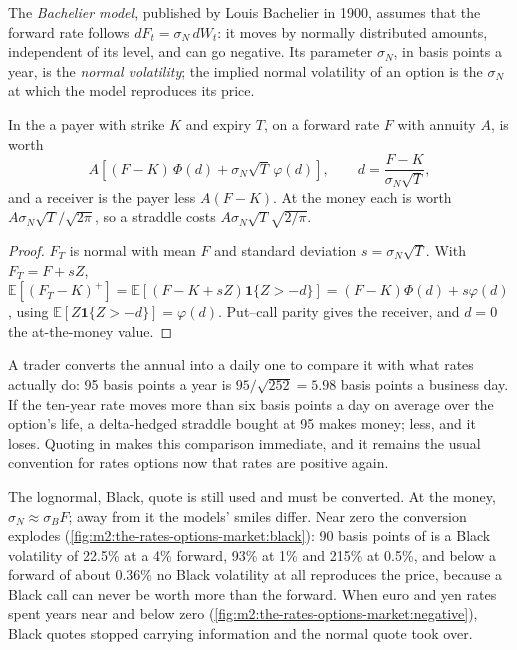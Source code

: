\begin{definition}\label{def:m2:the-rates-options-market:normal}
The \emph{Bachelier model}, published by Louis Bachelier
in 1900, assumes that the forward rate follows $dF_t = \sigma_N\,dW_t$: it
moves by normally distributed amounts, independent of its level, and can go
negative. Its parameter $\sigma_N$, in basis points a year, is the \emph{normal
volatility}; the implied normal volatility of an option
is the $\sigma_N$ at which the model reproduces its price.
\end{definition}

\begin{proposition}\label{prop:m2:the-rates-options-market:bachelier}
In the  a payer with strike $K$ and expiry $T$, on a forward
rate $F$ with annuity $A$, is worth
\[
A\left[(F-K)\,\Phi(d) + \sigma_N\sqrt{T}\,\varphi(d)\right], \qquad d = \frac{F-K}{\sigma_N\sqrt T},
\]
and a receiver is the payer less $A(F-K)$. At the money each is worth
$A\sigma_N\sqrt{T}/\sqrt{2\pi}$, so a straddle costs
$A\sigma_N\sqrt{T}\sqrt{2/\pi}$.
\end{proposition}

\begin{proof}
$F_T$ is normal with mean $F$ and standard deviation $s = \sigma_N\sqrt{T}$.
With $F_T = F + sZ$, $\mathbb{E}[(F_T-K)^+] = \mathbb{E}[(F-K+sZ)\mathbf 1\{Z>-d\}]
= (F-K)\Phi(d) + s\varphi(d)$, using $\mathbb{E}[Z\mathbf 1\{Z>-d\}] = \varphi(d)$.
Put--call parity gives the receiver, and $d = 0$ the at-the-money value.
\end{proof}

A trader converts the annual  into a daily one to compare it
with what rates actually do: 95 basis points a year is
$95/\sqrt{252} = 5.98$ basis points a business day. If the ten-year rate moves
more than six basis points a day on average over the option's life, a
delta-hedged straddle bought at 95 makes money; less, and it loses. Quoting in
 makes this comparison immediate, and it remains the usual
convention for rates options now that rates are positive again.

The lognormal, Black, quote is still used and must be converted. At the money,
$\sigma_N \approx \sigma_B F$; away from it the models' smiles differ. Near zero
the conversion explodes (\cref{fig:m2:the-rates-options-market:black}): 90
basis points of  is a Black volatility of 22.5\% at a 4\%
forward, 93\% at 1\% and 215\% at 0.5\%, and below a forward of about 0.36\%
no Black volatility at all reproduces the price, because a Black call can never
be worth more than the forward. When euro and yen rates spent years near and
below zero (\cref{fig:m2:the-rates-options-market:negative}), Black quotes
stopped carrying information and the normal quote took over.

